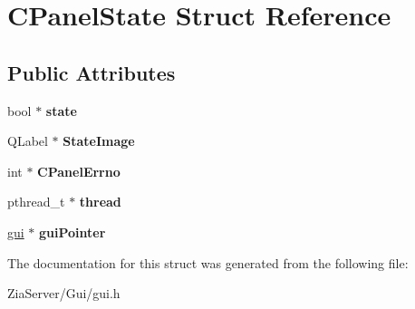 \hypertarget{struct_c_panel_state}{
\section{CPanelState Struct Reference}
\label{struct_c_panel_state}
}
\subsection*{Public Attributes}
\begin{DoxyCompactItemize}
\item 
\hypertarget{struct_c_panel_state_afe3d637639b6c42c0121d9cc142df329}{
bool $\ast$ {\bfseries state}}
\label{struct_c_panel_state_afe3d637639b6c42c0121d9cc142df329}

\item 
\hypertarget{struct_c_panel_state_acdf201f4a8a760eb92c7159fb7d3207f}{
QLabel $\ast$ {\bfseries StateImage}}
\label{struct_c_panel_state_acdf201f4a8a760eb92c7159fb7d3207f}

\item 
\hypertarget{struct_c_panel_state_ab0728c745859db235ac020cc5b95727a}{
int $\ast$ {\bfseries CPanelErrno}}
\label{struct_c_panel_state_ab0728c745859db235ac020cc5b95727a}

\item 
\hypertarget{struct_c_panel_state_a6f96cbe80459edf7b467b9b3b310289a}{
pthread\_\-t $\ast$ {\bfseries thread}}
\label{struct_c_panel_state_a6f96cbe80459edf7b467b9b3b310289a}

\item 
\hypertarget{struct_c_panel_state_a432d9edf67fd7888c5a78e54d217d437}{
\hyperlink{classgui}{gui} $\ast$ {\bfseries guiPointer}}
\label{struct_c_panel_state_a432d9edf67fd7888c5a78e54d217d437}

\end{DoxyCompactItemize}


The documentation for this struct was generated from the following file:\begin{DoxyCompactItemize}
\item 
ZiaServer/Gui/gui.h\end{DoxyCompactItemize}
